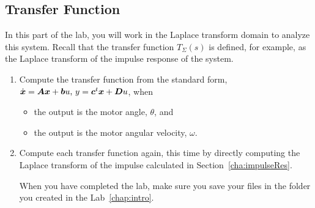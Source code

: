 \subsection{Transfer Function}

In this part of the lab, you will work in the Laplace transform domain to
analyze this system. Recall that the transfer function \(T_{\Sigma}(s)\) is
defined, for example, as the Laplace transform of the impulse response of the
system.
\begin{enumerate}
    \item Compute the transfer function from the
          standard form, \(\dot{\vect{x}}=\mat{A}\vect{x}+\vect{b}u$, \(y=\vect{c}^t\vect{x}+\mat{D}u\), when
          \begin{itemize}
              \item the output is the motor angle, \(\theta \), and
              \item the output is the motor angular velocity, \(\omega \).
          \end{itemize}

    \item Compute each transfer function again, this time by directly computing
          the Laplace transform of the impulse calculated in
          Section~\ref{cha:impulseRes}\@.

          When you have completed the lab, make sure you save your files in the folder
          you created in the Lab~\ref{chap:intro}.
\end{enumerate}

